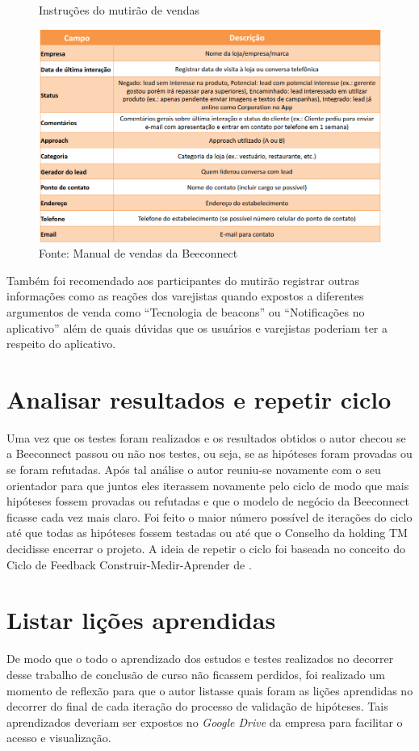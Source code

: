 \begin{figure}[H]
\caption{Instruções do mutirão de vendas}
\centerline{\includegraphics[width=1.0\textwidth]{img/intrucoes_mutirao}}
\label{fig:intrucoes_mutirao}
\caption* {Fonte: Manual de vendas da Beeconnect}
\end{figure}

Também foi recomendado aos participantes do mutirão registrar outras informações como as reações dos varejistas quando expostos a diferentes argumentos de venda como \enquote{Tecnologia de beacons} ou \enquote{Notificações no aplicativo} além de quais dúvidas que os usuários e varejistas poderiam ter a respeito do aplicativo.

\section{Analisar resultados e repetir ciclo}
\label{cha:analisar_resultados}
Uma vez que os testes foram realizados e os resultados obtidos o autor checou se a Beeconnect passou ou não nos testes, ou seja, se as hipóteses foram provadas ou se foram refutadas. 
Após tal análise o autor reuniu-se novamente com o seu orientador para que juntos eles iterassem novamente pelo ciclo de modo que mais hipóteses fossem provadas ou refutadas e que o modelo de negócio da Beeconnect ficasse cada vez mais claro. Foi feito o maior número possível de iterações do ciclo até que todas as hipóteses fossem testadas ou até que o Conselho da holding TM decidisse encerrar o projeto. A ideia de repetir o ciclo foi baseada no conceito do Ciclo de Feedback Construir-Medir-Aprender de .

\section{Listar lições aprendidas}
\label{cha:listar_licoes_aprendidas}
De modo que o todo o aprendizado dos estudos e testes realizados no decorrer desse trabalho de conclusão de curso não ficassem perdidos, foi realizado um momento de reflexão para que o autor listasse quais foram as lições aprendidas no decorrer do final de cada iteração do processo de validação de hipóteses. Tais aprendizados deveriam ser expostos no \textit{Google Drive} da empresa para facilitar o acesso e visualização.


